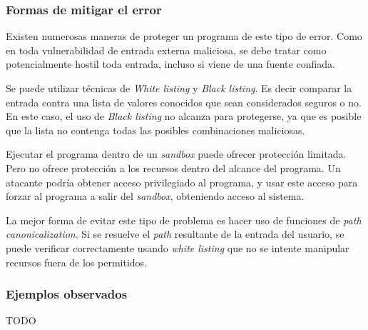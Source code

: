 \subsubsection{Formas de mitigar el error}

Existen numerosas maneras de proteger un programa de este tipo de error.
Como en toda vulnerabilidad de entrada externa maliciosa, se debe tratar como potencialmente hostil toda entrada, incluso si viene de una fuente confiada.

Se puede utilizar técnicas de \textit{White listing} y \textit{Black listing}.
Es decir comparar la entrada contra una lista de valores conocidos que sean considerados seguros o no.
En este caso, el uso de \textit{Black listing} no alcanza para protegerse, ya que es posible que la lista no contenga todas las posibles combinaciones maliciosas.

Ejecutar el programa dentro de un \textit{sandbox} puede ofrecer protección limitada.
Pero no ofrece protección a los recursos dentro del alcance del programa.
Un atacante podría obtener acceso privilegiado al programa, y usar este acceso para forzar al programa a salir del \textit{sandbox}, obteniendo acceso al sistema.

La mejor forma de evitar este tipo de problema es hacer uso de funciones de \textit{path canonicalization}.
Si se resuelve el \textit{path} resultante de la entrada del usuario, se puede verificar correctamente usando \textit{white listing} que no se intente manipular recursos fuera de los permitidos.


\subsubsection{Ejemplos observados}

TODO